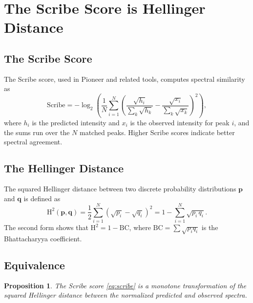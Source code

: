 \documentclass[11pt,a4paper]{article}
\newcommand{\Hell}{\mathrm{H}}
\newtheorem{proposition}{Proposition}
\begin{document}
\section{The Scribe Score is Hellinger Distance}
\label{sec:scribe-hellinger}

\subsection{The Scribe Score}

The Scribe score, used in Pioneer and related tools, computes spectral similarity as
\begin{equation}
    \text{Scribe} = -\log_2 \!\left(
        \frac{1}{N} \sum_{i=1}^{N}
        \left(
            \frac{\sqrt{h_i}}{\sum_k \sqrt{h_k}}
            - \frac{\sqrt{x_i}}{\sum_k \sqrt{x_k}}
        \right)^{\!2}
    \right),
    \label{eq:scribe}
\end{equation}
where $h_i$ is the predicted intensity and $x_i$ is the observed intensity for peak $i$,
and the sums run over the $N$ matched peaks. Higher Scribe scores indicate better spectral
agreement.

\subsection{The Hellinger Distance}

The squared Hellinger distance between two discrete probability distributions
$\mathbf{p}$ and $\mathbf{q}$ is defined as
\begin{equation}
    \Hell^2(\mathbf{p}, \mathbf{q})
    = \frac{1}{2} \sum_{i=1}^{N} \left(\sqrt{p_i} - \sqrt{q_i}\right)^2
    = 1 - \sum_{i=1}^{N} \sqrt{p_i \, q_i}.
    \label{eq:hellinger}
\end{equation}
The second form shows that $\Hell^2 = 1 - \text{BC}$, where
$\text{BC} = \sum \sqrt{p_i q_i}$ is the Bhattacharyya coefficient.

\subsection{Equivalence}

\begin{proposition}
The Scribe score \eqref{eq:scribe} is a monotone transformation of the squared Hellinger
distance between the normalized predicted and observed spectra.
\end{proposition}
\end{document}
